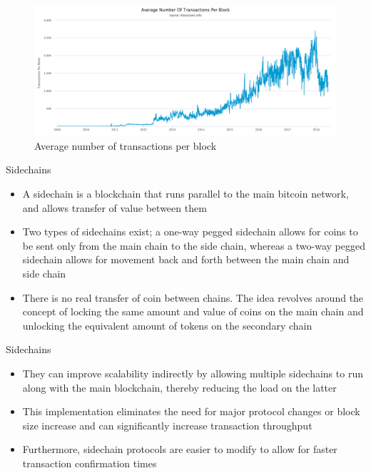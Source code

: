 \documentclass[11pt]{beamer}
\begin{document}
\begin{frame}{}
	\begin{figure}[]
		\centering
		\includegraphics  [scale=0.25]{Images/average-number-of-transactions-per-block}
		\caption{Average number of transactions per block}
	\end{figure}
\end{frame}

\begin{frame}{Sidechains}
	\begin{itemize}
		\item A sidechain is a blockchain that runs parallel to the main bitcoin network, and allows transfer of value between them
		\item Two types of sidechains exist; a one-way pegged sidechain allows for coins to be sent only from the main chain to the side chain, whereas a two-way pegged sidechain allows for movement back and forth between the main chain and side chain
		\item There is no real transfer of coin between chains. The idea revolves around the concept of locking the same amount and value of coins on the main chain and unlocking the equivalent amount of tokens on the secondary chain
	\end{itemize}
\end{frame}


\begin{frame}{Sidechains}
	\begin{itemize}
		\item They can improve scalability indirectly by allowing multiple sidechains to run along with the main blockchain, thereby reducing the load on the latter
		\item This implementation eliminates the need for major protocol changes or block size increase and can significantly increase transaction throughput
		\item Furthermore, sidechain protocols are easier to modify to allow for faster transaction confirmation times
	\end{itemize}
\end{frame}
\end{document}
